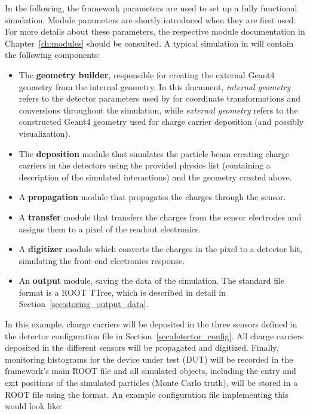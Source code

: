 In the following, the framework parameters are used to set up a fully functional simulation.
Module parameters are shortly introduced when they are first used.
For more details about these parameters, the respective module documentation in Chapter~\ref{ch:modules} should be consulted.
A typical simulation in \apsq will contain the following components:
\begin{itemize}

\item The \textbf{geometry builder}, responsible for creating the external Geant4 geometry from the internal geometry.
In this document, \emph{internal geometry} refers to the detector parameters used by \apsq for coordinate transformations and conversions throughout the simulation, while \emph{external geometry} refers to the constructed Geant4 geometry used for charge carrier deposition (and possibly visualization).
\item The \textbf{deposition} module that simulates the particle beam creating charge carriers in the detectors using the provided physics list (containing a description of the simulated interactions) and the geometry created above.
\item A \textbf{propagation} module that propagates the charges through the sensor.
\item A \textbf{transfer} module that transfers the charges from the sensor electrodes and assigns them to a pixel of the readout electronics.
\item A \textbf{digitizer} module which converts the charges in the pixel to a detector hit, simulating the front-end electronics response.
\item An \textbf{output} module, saving the data of the simulation.
The \apsq standard file format is a ROOT TTree, which is described in detail in Section~\ref{sec:storing_output_data}.
\end{itemize}

In this example, charge carriers will be deposited in the three sensors defined in the detector configuration file in Section~\ref{sec:detector_config}.
All charge carriers deposited in the different sensors will be propagated and digitized.
Finally, monitoring histograms for the device under test (DUT) will be recorded in the framework's main ROOT file and all simulated objects, including the entry and exit positions of the simulated particles (Monte Carlo truth), will be stored in a ROOT file using the \apsq format.
An example configuration file implementing this would look like:
\inputminted[frame=single,framesep=3pt,breaklines=true,tabsize=2,linenos]{ini}{../../etc/manual.conf}

